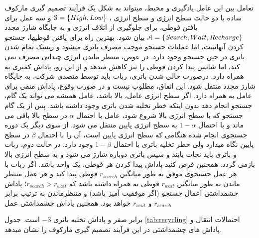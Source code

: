 تعامل بین این عامل یادگیری و محیط، می\nf تواند به شکل یک فرآیند تصمیم گیری مارکوف ساده با دو حالت سطح انرژی  و سطح انرژی ، 
${\EuScript{S} = \{High, Low\}}$ 
و سه عمل  برای یافتن قوطی،  برای جلوگیری از اتلاف انرژی و  به جایگاه شارژ مجدد 
$\EuScript{A}=\{Search, Wait, Recharge\}$
بیان شود. بهترین راه برای یافتن قوطی\nf ها، جستجو کردن آن\nf هاست، اما عملیات جستجو موجب مصرف باتری می\nf شود و ریسک تمام شدن باتری در حین جستجو وجود دارد. در عوض، منتظر ماندن انرژی چندانی مصرف نمی کند، اما شانس پیدا کردن قوطی را نیز کاهش می\nf دهد و از این رو، پاداش کمتری به همراه دارد. درصورت خالی شدن باتری، ربات باید توسط متصدی شرکت، به جایگاه شارژ مجدد منتقل شود. این اتفاق، مطلوب نیست و در صورت وقوع، پاداش منفی برای عامل به همراه دارد. 
اگر سطح انرژی عامل، بالا باشد، عامل همیشه می تواند یک گام، جستجو انجام دهد بدون اینکه خطر تخلیه شدن باتری وجود داشته باشد.
پس از یک گام جستجو که با سطح انرژی بالا شروع شود، عامل با احتمال
 $\alpha$
 در سطح بالا باقی می ماند و با احتمال 
 $1-\alpha$
 به سطح انرژی پایین منتقل می شود. از سوی دیگر یک دوره
جستجوی انجام شده هنگامی که سطح انرژی پایین است، آن را با احتمال $\beta$ در سطح پایین نگاه می\nf دارد ولی خطر تخلیه باتری با احتمال $1-\beta$ وجود دارد. در حالت دوم، ربات و باتری باید نجات یابند و سپس باتری دوباره شارژ می شود و به سطح انرژی بالا بازمی گردد. 
   همچنین فرض کنید پاداش پیدا کردن هر قوطی، یک واحد باشد. اگر ربات با هر عمل جستجوی موفق به طور میانگین $r_{search}$ قوطی پیدا کند و هر عمل منتظر ماندن به طور میانگین $r_{wait}$ قوطی به همراه داشته باشد که 
      $r_{search} > r_{wait}$؛
 پاداش چشمداشتی اعمال جستجو (اگر موفقیت آمیز باشد)  و منتظرماندن به ترتیب برابر $r_{search}$  و 
$r_{wait}$
    خواهد بود. همچنین پاداش چشمداشتی عمل 
   
   برابر صفر و پاداش تخلیه باتری 
   $-3$
است. جدول 
\ref{tab:recycling}
 احتمالات انتقال و پاداش های چشمداشتی در این فرآیند تصمیم گیری مارکوف را نشان می\nf دهد.


